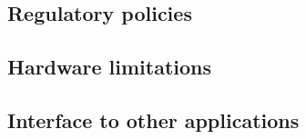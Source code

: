 \subsection{Regulatory policies}
\subsection{Hardware limitations}
\subsection{Interface to other applications}